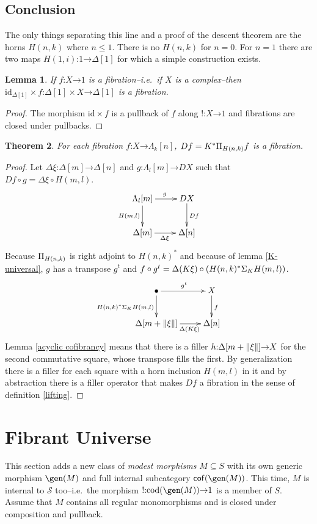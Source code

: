 \documentclass{amsart}
\theoremstyle{plain}
\newtheorem{theorem}{Theorem}
\newtheorem{lemma}[theorem]{Lemma}
\theoremstyle{definition}
\newcommand\cat\mathcal
\newcommand\id{\mathrm{id}}
\newcommand\cod{\mathrm{cod}}
\newcommand\ri{^*}
\newcommand\bang{!}
\newcommand\of{\mathord:}
\renewcommand\to{\mathord\rightarrow}
\newcommand\simplex\Delta
\newcommand\horn\Lambda
\begin{document}
\subsection{Conclusion}
The only things separating this line and a proof of the descent theorem are the horns $H(n,k)$ where $n\leq 1$. There is no $H(n,k)$ for $n=0$. For $n=1$ there are two maps $H(1,i)\of 1\to \simplex[1]$ for which a simple construction exists.

\begin{lemma} If $f\of X\to 1$ is a fibration--i.e.\ if $X$ is a complex--then $\id_{\simplex[1]}\times f\of\simplex[1]\times X\to \simplex[1]$ is a fibration. \end{lemma}

\begin{proof} The morphism $\id\times f$ is a pullback of $f$ along $\bang\of X\to 1$ and fibrations are closed under pullbacks. \end{proof}

\begin{theorem} For each fibration $f\of X\to\horn_k[n]$, $Df=K\ri\depprod{H(n,k)}f$ is a fibration. \label{descent} \end{theorem}


\begin{proof} Let $\simplex\xi\of \simplex[m]\to\simplex[n]$ and $g\of \horn_l[m]\to DX$ such that $Df\circ g = \simplex\xi\circ H(m,l)$. 
\[
	\xymatrix{
		\horn_l[m]\ar[r]^g\ar[d]_{H(m,l)} & DX\ar[d]^{Df} \\
		\simplex[m]\ar[r]_{\simplex\xi} & \simplex[n]
	}	
\]
Because $\Pi_{H(n,k)}$ is right adjoint to $H(n,k)\ri$ and because of lemma \ref{K-universal}, $g$ has a transpose $g^t$ and $f\circ g^t = \simplex(K\xi)\circ (H(n,k)\ri \depsum{K} H(m,l))$.
\[
	\xymatrix{
		\bullet\ar[r]^{g^t}\ar[d]_{H(n,k)\ri \depsum K H(m,l)} & X\ar[d]^{f} \\
		\simplex[m+\norm\xi]\ar[r]_(.6){\simplex(K\xi)} & \simplex[n]
	}	
\]
Lemma \ref{acyclic cofibrancy} means that there is a filler $h\of \simplex[m+\norm\xi]\to X$ for the second commutative square, whose transpose fills the first.
By generalization there is a filler for each square with a horn inclusion $H(m,l)$ in it and by abstraction there is a filler operator that makes $Df$ a fibration in the sense of definition \ref{lifting}.
\end{proof}

\section{Fibrant Universe}
This section adds a new class of \emph{modest morphisms} $M\subseteq S$ with its own generic morphism $\gen(M)$ and full internal subcategory $\cof(\gen(M))$. This time, $M$ is internal to $\cat S$ too--i.e.\ the morphism $\bang\of\cod(\gen(M))\to 1$ is a member of $S$. Assume that $M$ contains all regular monomorphisms and is closed under composition and pullback.
\end{document}
